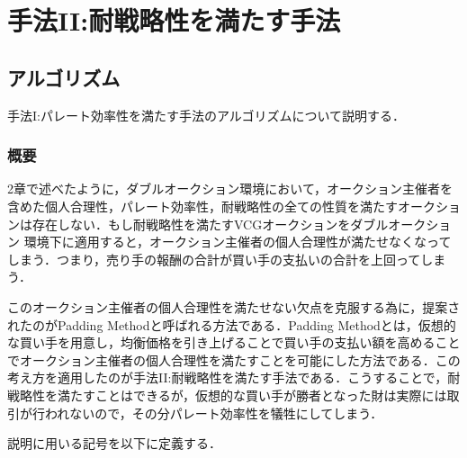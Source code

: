 \hypertarget{ux624bux6cd5iiux8010ux6226ux7565ux6027ux3092ux6e80ux305fux3059ux624bux6cd5}{%
\chapter{手法II:耐戦略性を満たす手法}\label{ux624bux6cd5iiux8010ux6226ux7565ux6027ux3092ux6e80ux305fux3059ux624bux6cd5}}

\hypertarget{ux30a2ux30ebux30b4ux30eaux30baux30e0-1}{%
\section{アルゴリズム}\label{ux30a2ux30ebux30b4ux30eaux30baux30e0-1}}

手法I:パレート効率性を満たす手法のアルゴリズムについて説明する．

\hypertarget{ux6982ux8981-1}{%
\subsection{概要}\label{ux6982ux8981-1}}

2章で述べたように，ダブルオークション環境において，オークション主催者を含めた個人合理性，パレート効率性，耐戦略性の全ての性質を満たすオークションは存在しない．もし耐戦略性を満たすVCGオークションをダブルオークション
環境下に適用すると，オークション主催者の個人合理性が満たせなくなってしまう．つまり，売り手の報酬の合計が買い手の支払いの合計を上回ってしまう．

このオークション主催者の個人合理性を満たせない欠点を克服する為に，提案されたのがPadding
Methodと呼ばれる方法である．Padding
Methodとは，仮想的な買い手を用意し，均衡価格を引き上げることで買い手の支払い額を高めることでオークション主催者の個人合理性を満たすことを可能にした方法である．この考え方を適用したのが手法II:耐戦略性を満たす手法である．こうすることで，耐戦略性を満たすことはできるが，仮想的な買い手が勝者となった財は実際には取引が行われないので，その分パレート効率性を犠牲にしてしまう．

説明に用いる記号を以下に定義する．

